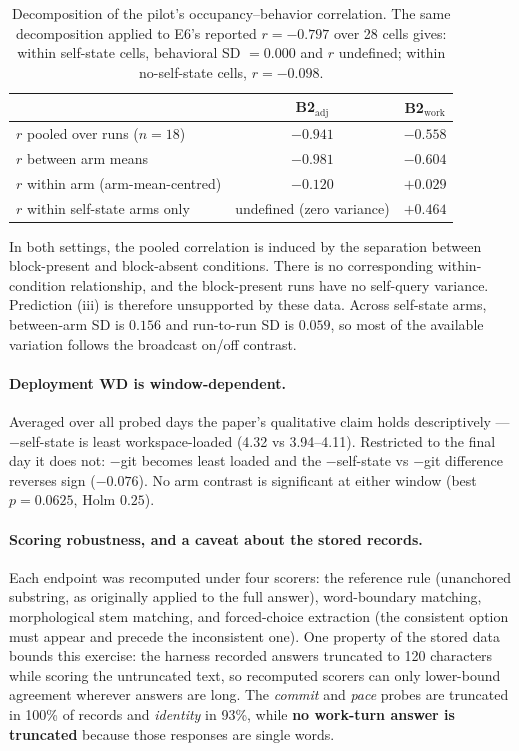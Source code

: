 \documentclass[11pt]{article}
\begin{document}
\begin{table}[h]
\centering\small
\begin{tabular}{lcc}
\toprule
& B2$_{\mathrm{adj}}$ & B2$_{\mathrm{work}}$ \\
\midrule
$r$ pooled over runs ($n=18$) & $-0.941$ & $-0.558$ \\
$r$ between arm means & $-0.981$ & $-0.604$ \\
$r$ within arm (arm-mean-centred) & $-0.120$ & $+0.029$ \\
$r$ within self-state arms only & undefined (zero variance) & $+0.464$ \\
\bottomrule
\end{tabular}
\caption{Decomposition of the pilot's occupancy--behavior correlation. The same decomposition applied to E6's reported $r=-0.797$ over 28 cells gives: within self-state cells, behavioral SD $=0.000$ and $r$ undefined; within no-self-state cells, $r=-0.098$.}
\label{tab:corr}
\end{table}

In both settings, the pooled correlation is induced by the separation between block-present and block-absent conditions. There is no corresponding within-condition relationship, and the block-present runs have no self-query variance. Prediction (iii) is therefore unsupported by these data. Across self-state arms, between-arm SD is $0.156$ and run-to-run SD is $0.059$, so most of the available variation follows the broadcast on/off contrast.

\paragraph{Deployment WD is window-dependent.} Averaged over all probed days the paper's qualitative claim holds descriptively --- $-$self-state is least workspace-loaded (4.32 vs 3.94--4.11). Restricted to the final day it does not: $-$git becomes least loaded and the $-$self-state vs $-$git difference reverses sign ($-0.076$). No arm contrast is significant at either window (best $p=0.0625$, Holm $0.25$).

\paragraph{Scoring robustness, and a caveat about the stored records.} Each endpoint was recomputed under four scorers: the reference rule (unanchored substring, as originally applied to the full answer), word-boundary matching, morphological stem matching, and forced-choice extraction (the consistent option must appear and precede the inconsistent one). One property of the stored data bounds this exercise: the harness recorded answers truncated to 120 characters while scoring the untruncated text, so recomputed scorers can only lower-bound agreement wherever answers are long. The \emph{commit} and \emph{pace} probes are truncated in 100\% of records and \emph{identity} in 93\%, while \textbf{no work-turn answer is truncated} because those responses are single words.
\end{document}
